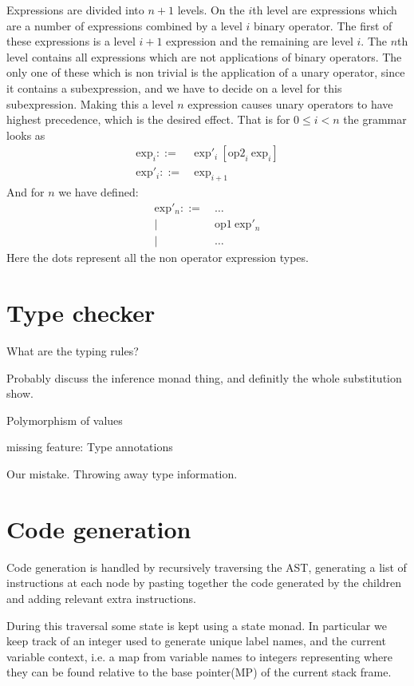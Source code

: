 \documentclass{scrartcl}
\begin{document}
Expressions are divided into $n + 1$ levels. On the $i$th level are 
expressions which are a number of expressions combined by a level
$i$ binary operator. The first of these expressions is a level
$i+1$ expression
and the remaining are level $i$. The $n$th level contains all 
expressions which are not applications of binary operators.
The only one of these which is non trivial is the application of a
unary operator,
since it contains a subexpression, and we have to decide on a
level for this subexpression. Making this a level $n$ expression
causes unary operators to have highest precedence, which is the
desired effect.
That is for $0 \leq i < n$ the grammar looks as
\begin{align*}
\text{exp}_i ::=&\ \text{exp}'_i\ [ \text{op2}_i\ \text{exp}_i ] \\
\text{exp}'_i ::=&\ \text{exp}_{i+1} 
\end{align*}
And for $n$ we have defined:
\begin{align*}
\text{exp}'_{n} ::=&\ \ldots \\
    | &\ \text{op1}\ \text{exp}'_{n} \\
    | &\ \ldots
\end{align*}
Here the dots represent all the non operator expression types.

\section{Type checker}
What are the typing rules?

Probably discuss the inference monad thing, and definitly the whole
substitution show.

Polymorphism of values

missing feature: Type annotations

Our mistake. Throwing away type information.

\section{Code generation}

Code generation is handled by recursively traversing the AST, generating
a list of instructions at each node by pasting together the code
generated by the children and adding relevant extra instructions.

During this traversal some state is kept using a state monad. In
particular we keep track of an integer used to generate unique label
names, and the current variable context, i.e. a map
from variable names to integers representing where they can be found
relative to the base pointer(MP) of the current stack frame.
\end{document}
